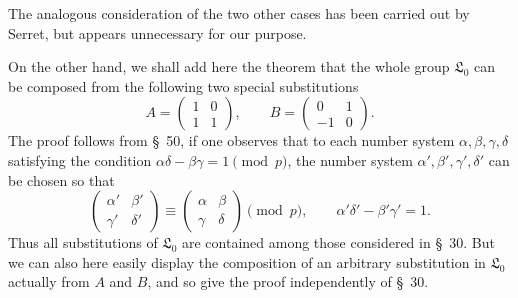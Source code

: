 \documentclass[11pt]{article}
\newcommand{\Lzero}{\mathfrak L_0}
\begin{document}
The analogous consideration of the two other cases has been carried out by Serret, but appears unnecessary for our purpose.

On the other hand, we shall add here the theorem that the whole group $\Lzero$ can be composed from the following two special substitutions
\begin{equation}
 A=\begin{pmatrix}1&0\\1&1\end{pmatrix},
 \qquad
 B=\begin{pmatrix}0&1\\-1&0\end{pmatrix}.
\tag{10}
\end{equation}
The proof follows from \S~50, if one observes that to each number system $\alpha,\beta,\gamma,\delta$ satisfying the condition $\alpha\delta-\beta\gamma=1\pmod p$, the number system $\alpha',\beta',\gamma',\delta'$ can be chosen so that
\[
 \begin{pmatrix}\alpha'&\beta'\\\gamma'&\delta'\end{pmatrix}
 \equiv
 \begin{pmatrix}\alpha&\beta\\\gamma&\delta\end{pmatrix}
 \pmod p,
 \qquad
 \alpha'\delta'-\beta'\gamma'=1.
\]
Thus all substitutions of $\Lzero$ are contained among those considered in \S~30. But we can also here easily display the composition of an arbitrary substitution in $\Lzero$ actually from $A$ and $B$, and so give the proof independently of \S~30.
\end{document}
